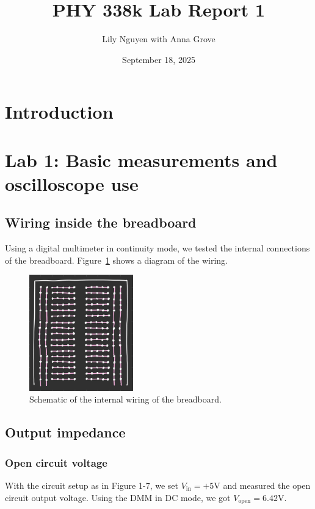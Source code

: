 \documentclass{article}
\title{PHY 338k Lab Report 1}
\author{Lily Nguyen with Anna Grove}
\date{September 18, 2025}
\begin{document}
\maketitle

\section{Introduction}


\section{Lab 1: Basic measurements and oscilloscope use}

\subsection{Wiring inside the breadboard}

Using a digital multimeter in continuity mode, we tested the internal
connections of the breadboard. Figure~\ref{fig:breadboard} shows a diagram
of the wiring.

\begin{figure}[h!]
    \centering
    \includegraphics[width=0.4\textwidth]{1.1a.png}
    \caption{Schematic of the internal wiring of the breadboard.}
    \label{fig:breadboard}
\end{figure}

\subsection{Output impedance}

\subsubsection{Open circuit voltage}

With the circuit setup as in Figure 1-7, we set $V_\text{in}=+5\si{\volt}$ and
measured the open circuit output voltage. Using the DMM in DC mode, we got 
$V_\text{open}=6.42\si{\volt}$.
\end{document}
